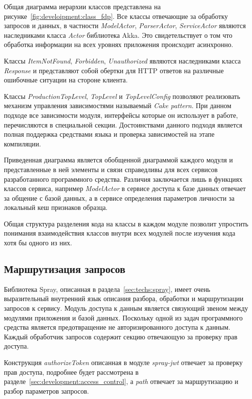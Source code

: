 Общая диаграмма иерархии классов представлена на рисунке~\ref{fig:develoipment:class_fdp}. Все классы отвечающие за обработку запросов и данных, в частности \emph{ModelActor}, \emph{ParserActor}, \emph{ServiceActor} являются наследниками класса \emph{Actor} библиотека Akka. Это свидетельствует о том что обработка информации на всех уровнях приложения происходит асинхронно.

Классы \emph{ItemNotFound}, \emph{Forbidden}, \emph{Unauthorized} являются наследниками класса \emph{Response} и представляют собой обертки для HTTP ответов на различные ошибочные ситуации на стороне клиента.

Классы \emph{ProductionTopLevel}, \emph{TopLevel} и \emph{TopLevelConfig} позволяют реализовать механизм управления зависимостями называемый \emph{Cake pattern}. При данном подходе все зависимости модуля, интерфейсы которые он использует в работе, перечисляются в специальной секции. Достоинствами данного подходя является полная поддержка средствами языка и проверка зависимостей на этапе компиляции.

Приведенная диаграмма является обобщенной диаграммой каждого модуля и представленные в ней элементы и связи справедливы для всех сервисов разработанного программного средства. Различия заключается лишь в функциях классов сервиса, например \emph{ModelActor} в сервисе доступа к базе данных отвечает за общение с базой данных, а в сервисе определения параметров личности за локальный кеш признаков образца.

Общая структура разделения кода на классы в каждом модуле позволит упростить понимания взаимодействия классов внутри всех модулей после изучения кода хотя бы одного из них.

\subsection{Маршрутизация запросов}
Библиотека Spray, описанная в раздела~\ref{sec:techs:spray}, имеет очень выразительный внутренний язык описания разбора, обработки и маршрутизации запросов к сервису. Модуль доступа к данным является связующий звеном между модулями приложения и базой данных. Поскольку одной из задач программного средства является предотвращение не авторизированного доступа к данным. Каждый обработчик запросов содержит секцию отвечающую за проверку прав доступа.

Конструкция \emph{authorizeToken} описанная в модуле \emph{spray-jwt} отвечает за проверку прав доступа, подробнее будет рассмотрена в разделе~\ref{sec:development:access_control}, а \emph{path} отвечает за маршрутизацию и разбор параметров запросов. 

